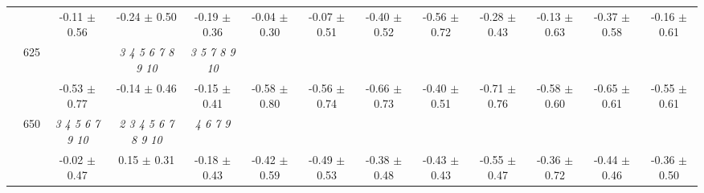 \begin{table}[h]
{\begin{tabular}{
        ccccccccccccc}
 & & -0.11 $\pm$ 0.56& -0.24 $\pm$ 0.50& -0.19 $\pm$ 0.36& -0.04 $\pm$ 0.30& -0.07 $\pm$ 0.51& -0.40 $\pm$ 0.52& -0.56 $\pm$ 0.72& -0.28 $\pm$ 0.43& -0.13 $\pm$ 0.63& -0.37 $\pm$ 0.58& -0.16 $\pm$ 0.61 \\ 
 & \multirow{2}{*}{625}& \cellcolor[HTML]{EFEFEF} & \cellcolor[HTML]{EFEFEF} \textit{  3  4  5  6  7  8  9 10 }& \cellcolor[HTML]{EFEFEF} \textit{  3  5  7  8  9 10 }& \cellcolor[HTML]{EFEFEF} & \cellcolor[HTML]{EFEFEF} & \cellcolor[HTML]{EFEFEF} & \cellcolor[HTML]{EFEFEF} & \cellcolor[HTML]{EFEFEF} & \cellcolor[HTML]{EFEFEF} & \cellcolor[HTML]{EFEFEF} & \cellcolor[HTML]{EFEFEF}  \\ 
 & & \cellcolor[HTML]{EFEFEF} -0.53 $\pm$ 0.77& \cellcolor[HTML]{EFEFEF} -0.14 $\pm$ 0.46& \cellcolor[HTML]{EFEFEF} -0.15 $\pm$ 0.41& \cellcolor[HTML]{EFEFEF} -0.58 $\pm$ 0.80& \cellcolor[HTML]{EFEFEF} -0.56 $\pm$ 0.74& \cellcolor[HTML]{EFEFEF} -0.66 $\pm$ 0.73& \cellcolor[HTML]{EFEFEF} -0.40 $\pm$ 0.51& \cellcolor[HTML]{EFEFEF} -0.71 $\pm$ 0.76& \cellcolor[HTML]{EFEFEF} -0.58 $\pm$ 0.60& \cellcolor[HTML]{EFEFEF} -0.65 $\pm$ 0.61& \cellcolor[HTML]{EFEFEF} -0.55 $\pm$ 0.61 \\ 
 & \multirow{2}{*}{650}& \textit{  3  4  5  6  7  9 10 }& \textit{  2  3  4  5  6  7  8  9 10 }& \textit{ 4 6 7 9 }& & & & & & & &  \\ 
 & & -0.02 $\pm$ 0.47& 0.15 $\pm$ 0.31& -0.18 $\pm$ 0.43& -0.42 $\pm$ 0.59& -0.49 $\pm$ 0.53& -0.38 $\pm$ 0.48& -0.43 $\pm$ 0.43& -0.55 $\pm$ 0.47& -0.36 $\pm$ 0.72& -0.44 $\pm$ 0.46& -0.36 $\pm$ 0.50 \\ \midrule 

        \bottomrule
        \end{tabular}%
        }

        \end{table}
        
